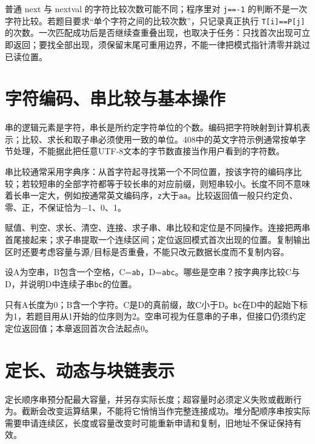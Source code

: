 普通 next 与 nextval 的字符比较次数可能不同；程序里对 \texttt{j=\allowbreak{}=\allowbreak{}-1} 的判断不是一次字符比较。若题目要求``单个字符之间的比较次数''，只记录真正执行 \texttt{T[i]=\allowbreak{}=\allowbreak{}P[j]} 的次数。一次匹配成功后是否继续查重叠出现，也取决于任务：只找首次出现可立即返回；要找全部出现，须保留末尾可重用边界，不能一律把模式指针清零并跳过已读位置。

\section{字符编码、串比较与基本操作}\label{DS04-ops}

\begin{definition}[字符序列与表示单位]

串的逻辑元素是字符，串长是所约定字符单位的个数。编码把字符映射到计算机表示；比较、求长和取子串必须使用一致的单位。408中的英文字符示例通常按单字节处理，不能据此把任意UTF-8文本的字节数直接当作用户看到的字符数。

\end{definition}

串比较通常采用字典序：从首字符起寻找第一个不同位置，按该字符的编码序比较；若较短串的全部字符都等于较长串的对应前缀，则短串较小。长度不同不意味着长串一定大，例如按通常英文编码序，\texttt{z}大于\texttt{aa}。比较返回值一般只约定负、零、正，不保证恰为\ensuremath{-}1、0、1。

赋值、判空、求长、清空、连接、求子串、串比较和定位是不同操作。连接把两串首尾接起来；求子串提取一个连续区间；定位返回模式首次出现的位置。复制输出区时还要考虑容量与源/目标是否重叠，不能只改元数据长度而不复制内容。

\begin{example}

设A为空串，B包含一个空格，C=\texttt{ab}，D=\texttt{abc}。哪些是空串？按字典序比较C与D，并说明D中连续子串\texttt{bc}的位置。

\end{example}

只有A长度为0；B含一个字符。C是D的真前缀，故C小于D。\texttt{bc}在D中的起始下标为1，若题目用从1开始的位序则为2。空串可视为任意串的子串，但接口仍须约定定位返回值；本章返回首次合法起点0。

\section{定长、动态与块链表示}\label{DS04-storage}

定长顺序串预分配最大容量，并另存实际长度；超容量时必须定义失败或截断行为。截断会改变运算结果，不能将它悄悄当作完整连接成功。堆分配顺序串按实际需要申请连续区，长度或容量改变时可能重新申请和复制，旧地址不保证保持有效。


